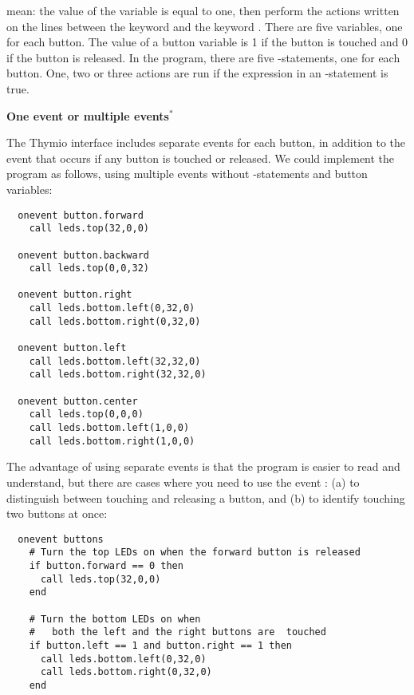 mean:  the value of the variable  is equal to
one, then perform the actions written on the lines between the keyword
 and the keyword . There are five  variables,
one for each button. The value of a button variable is 1 if the button
is touched and 0 if the button is released. In the program, there are
five -statements, one for each button. One, two or three actions
are run if the expression in an -statement is true.

\textbf{\large One event or multiple events$^*$}

The Thymio interface includes separate events for each button, in
addition to the  event that occurs if any button is touched
or released. We could implement the program as follows, using multiple
events without -statements and button variables:

\begin{footnotesize}
\begin{verbatim}
  onevent button.forward
    call leds.top(32,0,0)
  
  onevent button.backward
    call leds.top(0,0,32)
  
  onevent button.right
    call leds.bottom.left(0,32,0)
    call leds.bottom.right(0,32,0)
  
  onevent button.left
    call leds.bottom.left(32,32,0)
    call leds.bottom.right(32,32,0)
  
  onevent button.center
    call leds.top(0,0,0)
    call leds.bottom.left(1,0,0)
    call leds.bottom.right(1,0,0)
\end{verbatim}
\end{footnotesize}

The advantage of using separate events is that the program is easier to
read and understand, but there are cases where you need to use the event
: (a) to distinguish between touching and releasing a button,
and (b) to identify touching two buttons at once:

\begin{footnotesize}
\begin{verbatim}
  onevent buttons
    # Turn the top LEDs on when the forward button is released
    if button.forward == 0 then
      call leds.top(32,0,0)
    end

    # Turn the bottom LEDs on when
    #   both the left and the right buttons are  touched
    if button.left == 1 and button.right == 1 then
      call leds.bottom.left(0,32,0)
      call leds.bottom.right(0,32,0)
    end
\end{verbatim}
\end{footnotesize}


